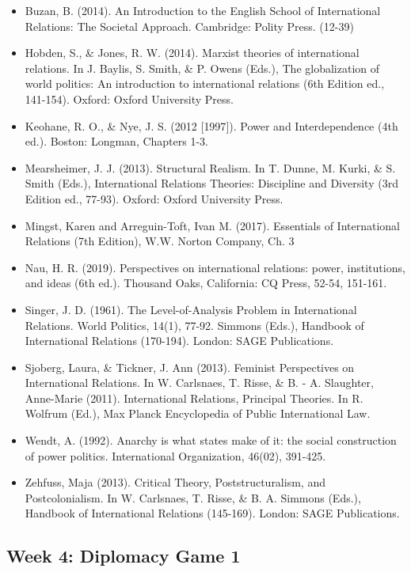 \documentclass[
  letterpaper,
  DIV=11,
  numbers=noendperiod]{scrartcl}
\providecommand{\tightlist}{%
  \setlength{\itemsep}{0pt}\setlength{\parskip}{0pt}}\usepackage{longtable,booktabs,array}
\begin{document}
\begin{itemize}
\tightlist
\item
  Buzan, B. (2014). An Introduction to the English School of
  International Relations: The Societal Approach. Cambridge: Polity
  Press. (12-39)
\item
  Hobden, S., \& Jones, R. W. (2014). Marxist theories of international
  relations. In J. Baylis, S. Smith, \& P. Owens (Eds.), The
  globalization of world politics: An introduction to international
  relations (6th Edition ed., 141-154). Oxford: Oxford University Press.
\item
  Keohane, R. O., \& Nye, J. S. (2012 {[}1997{]}). Power and
  Interdependence (4th ed.). Boston: Longman, Chapters 1-3.
\item
  Mearsheimer, J. J. (2013). Structural Realism. In T. Dunne, M. Kurki,
  \& S. Smith (Eds.), International Relations Theories: Discipline and
  Diversity (3rd Edition ed., 77-93). Oxford: Oxford University Press.
\item
  Mingst, Karen and Arreguin-Toft, Ivan M. (2017). Essentials of
  International Relations (7th Edition), W.W. Norton Company, Ch. 3
\item
  Nau, H. R. (2019). Perspectives on international relations: power,
  institutions, and ideas (6th ed.). Thousand Oaks, California: CQ
  Press, 52-54, 151-161.
\item
  Singer, J. D. (1961). The Level-of-Analysis Problem in International
  Relations. World Politics, 14(1), 77-92. Simmons (Eds.), Handbook of
  International Relations (170-194). London: SAGE Publications.
\item
  Sjoberg, Laura, \& Tickner, J. Ann (2013). Feminist Perspectives on
  International Relations. In W. Carlsnaes, T. Risse, \& B. - A.
  Slaughter, Anne-Marie (2011). International Relations, Principal
  Theories. In R. Wolfrum (Ed.), Max Planck Encyclopedia of Public
  International Law.
\item
  Wendt, A. (1992). Anarchy is what states make of it: the social
  construction of power politics. International Organization, 46(02),
  391-425.
\item
  Zehfuss, Maja (2013). Critical Theory, Poststructuralism, and
  Postcolonialism. In W. Carlsnaes, T. Risse, \& B. A. Simmons (Eds.),
  Handbook of International Relations (145-169). London: SAGE
  Publications.
\end{itemize}

\hypertarget{week-4-diplomacy-game-1}{%
\subsection*{Week 4: Diplomacy Game 1}\label{week-4-diplomacy-game-1}}
\end{document}
